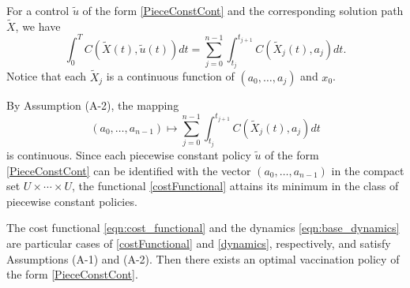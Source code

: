 For a control $\tilde{u}$ of the form \eqref{PieceConstCont} and the
corresponding solution path $\tilde{X}$, we have
\[
  \int_0^T
    C(\tilde{X}(t),
    \tilde{u}(t)) dt =
      \sum_{j=0}^{n-1}
        \int_{t_j}^{t_{j+1}}
        C(\tilde{X}_j(t),a_j) dt.
\]
Notice that each $\tilde{X}_j$ is a continuous function of $(a_0,\ldots,a_j)$
and $x_0$.

By Assumption (A-2), the mapping
\[
  (a_0,\ldots,a_{n-1})
  \mapsto
  \sum_{j=0}^{n-1}
  \int_{t_j}^{t_{j+1}} C(\tilde{X}_j(t),a_j) dt
\]
is continuous. Since each piecewise constant policy $\tilde{u}$ of the form
\eqref{PieceConstCont} can be identified with the vector $(a_0,\ldots,a_{n-1})$
in the compact set $U\times\cdots\times U$, the functional
\eqref{costFunctional} attains its minimum in the class of piecewise constant
policies.

    The cost functional \eqref{eqn:cost_functional} and the dynamics
\eqref{eqn:base_dynamics} are particular cases of \eqref{costFunctional} and
\eqref{dynamics}, respectively, and satisfy Assumptions (A-1) and (A-2). Then
there exists an optimal vaccination policy of the form \eqref{PieceConstCont}.
